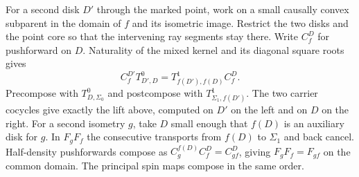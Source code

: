 \documentclass[
  english,
  11pt,
  reqno]{amsart}
\begin{document}
For a second disk \(D'\) through the marked point, work on a small
causally convex subparent in the domain of \(f\) and its isometric
image. Restrict the two disks and the point core so that the intervening
ray segments stay there. Write \(C_f^D\) for pushforward on \(D\).
Naturality of the mixed kernel and its diagonal square roots gives \[
C_f^{D'}T^0_{D',D}=T^1_{f(D'),f(D)}C_f^D .
\] Precompose with \(T^0_{D,\Sigma_0}\) and postcompose with
\(T^1_{\Sigma_1,f(D')}\). The two carrier cocycles give exactly the lift
above, computed on \(D'\) on the left and on \(D\) on the right. For a
second isometry \(g\), take \(D\) small enough that \(f(D)\) is an
auxiliary disk for \(g\). In \(F_gF_f\) the consecutive transports from
\(f(D)\) to \(\Sigma_1\) and back cancel. Half-density pushforwards
compose as \(C_g^{f(D)}C_f^D=C_{gf}^D\), giving \(F_gF_f=F_{gf}\) on the
common domain. The principal spin maps compose in the same order.
\end{document}

